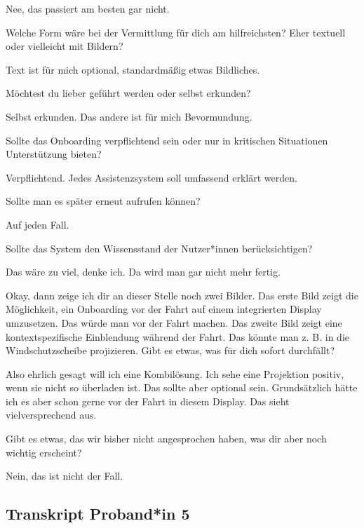 Nee, das passiert am besten gar nicht.

\interviewerin
Welche Form wäre bei der Vermittlung für dich am hilfreichsten? Eher
textuell oder vielleicht mit Bildern?

Text ist für mich optional, standardmäßig etwas Bildliches.

\interviewerin
Möchtest du lieber geführt werden oder selbst erkunden?

Selbst erkunden. Das andere ist für mich Bevormundung.

\interviewerin
Sollte das Onboarding verpflichtend sein oder nur in kritischen
Situationen Unterstützung bieten?

Verpflichtend. Jedes Assistenzsystem soll umfassend erklärt werden.

\interviewerin
Sollte man es später erneut aufrufen können?

Auf jeden Fall.

\interviewerin
Sollte das System den Wissensstand der Nutzer*innen berücksichtigen?

Das wäre zu viel, denke ich. Da wird man gar nicht mehr fertig.

\interviewerin
Okay, dann zeige ich dir an dieser Stelle noch zwei Bilder. Das erste
Bild zeigt die Möglichkeit, ein Onboarding vor der Fahrt auf einem
integrierten Display umzusetzen. Das würde man vor der Fahrt machen.
Das zweite Bild zeigt eine kontextspezifische Einblendung während der
Fahrt. Das könnte man z. B. in die Windschutzscheibe projizieren. Gibt
es etwas, was für dich sofort durchfällt?

Also ehrlich gesagt will ich eine Kombilösung. Ich sehe eine Projektion
positiv, wenn sie nicht so überladen ist. Das sollte aber optional sein.
Grundsätzlich hätte ich es aber schon gerne vor der Fahrt in diesem
Display. Das sieht vielversprechend aus.

\interviewerin
Gibt es etwas, das wir bisher nicht angesprochen haben, was dir aber
noch wichtig erscheint?

Nein, das ist nicht der Fall.



\clearpage
\subsection{Transkript Proband*in 5}
\label{subsec:transkript-p5}

